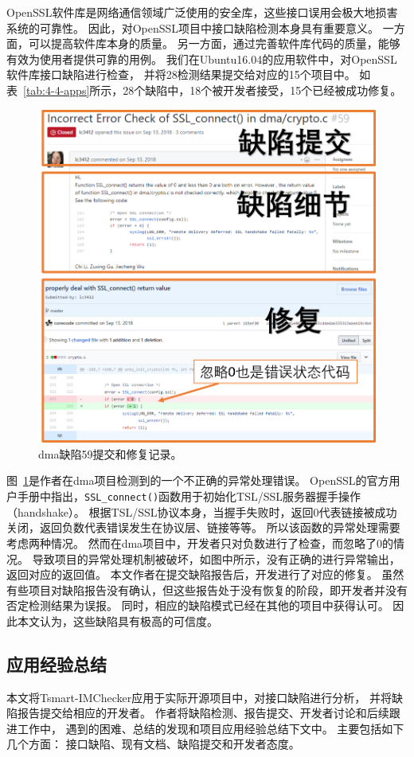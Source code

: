 OpenSSL软件库是网络通信领域广泛使用的安全库，这些接口误用会极大地损害系统的可靠性。
因此，对OpenSSL项目中接口缺陷检测本身具有重要意义。
一方面，可以提高软件库本身的质量。
另一方面，通过完善软件库代码的质量，能够有效为使用者提供可靠的用例。
我们在Ubuntu16.04的应用软件中，对OpenSSL软件库接口缺陷进行检查，
并将28检测结果提交给对应的15个项目中。
如表~\ref{tab:4-4-apps}所示，28个缺陷中，18个被开发者接受，15个已经被成功修复。

\begin{figure}[t]
	\centering
	\includegraphics[width=0.8\linewidth]{figures/cp4-dma-example.png}
	\caption{
		dma缺陷59提交和修复记录。
	}
	\label{fig:4-4-dma-example}
\end{figure}

图~\ref{fig:4-4-dma-example}是作者在dma项目检测到的一个不正确的异常处理错误。
OpenSSL的官方用户手册中指出，\texttt{SSL\_connect()}函数用于初始化TSL/SSL服务器握手操作（handshake）。
根据TSL/SSL协议本身，当握手失败时，返回0代表链接被成功关闭，返回负数代表错误发生在协议层、链接等等。
所以该函数的异常处理需要考虑两种情况。
然而在dma项目中，开发者只对负数进行了检查，而忽略了0的情况。
导致项目的异常处理机制被破坏，如图中所示，没有正确的进行异常输出，返回对应的返回值。
本文作者在提交缺陷报告后，开发进行了对应的修复。
虽然有些项目对缺陷报告没有确认，但这些报告处于没有恢复的阶段，即开发者并没有否定检测结果为误报。
同时，相应的缺陷模式已经在其他的项目中获得认可。
因此本文认为，这些缺陷具有极高的可信度。


\subsection{应用经验总结}
本文将Tsmart-IMChecker应用于实际开源项目中，对接口缺陷进行分析，
并将缺陷报告提交给相应的开发者。
作者将缺陷检测、报告提交、开发者讨论和后续跟进工作中，
遇到的困难、总结的发现和项目应用经验总结下文中。
主要包括如下几个方面：
接口缺陷、现有文档、缺陷提交和开发者态度。

